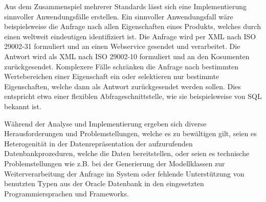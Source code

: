 Aus dem Zusammenspiel mehrerer Standards lässt sich eine Implementierung sinnvoller Anwendungsfälle erstellen. 
Ein sinnvoller Anwendungsfall wäre beispielsweise die Anfrage nach allen Eigenschaften eines Produkts, welches durch einen weltweit eindeutigen  identifiziert ist. Die Anfrage wird per XML nach ISO 29002-31 formuliert und an einen \gls{Webservice} gesendet und verarbeitet. Die Antwort wird als XML nach ISO 29002-10 formuliert und an den Kosumenten zurückgesendet. Komplexere Fälle schränken die Anfrage nach bestimmten Wertebereichen einer Eigenschaft ein oder selektieren nur bestimmte Eigenschaften, welche dann als Antwort zurückgesendet werden sollen. Dies entspricht etwa einer flexiblen \gls{Abfrageschnittstelle}, wie sie beispielsweise von SQL bekannt ist.  

Während der Analyse und Implementierung ergeben sich diverse Herausforderungen und Problemstellungen, welche es zu bewältigen gilt, seien es Heterogenität in der Datenrepräsentation der aufzurufenden Datenbankprozeduren, welche die Daten bereitstellen, oder seien es technische Problemstellungen wie z.B. bei der Generierung der Modellklassen zur Weiterverarbeitung der Anfrage im System oder fehlende Unterstützung von benutzten Typen aus der Oracle Datenbank in den eingesetzten Programmiersprachen und Frameworks.  




